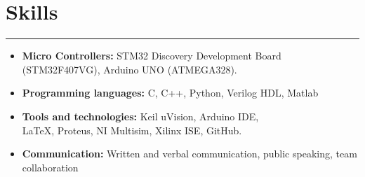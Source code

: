 \documentclass[10pt]{article}
\begin{document}
\section*{Skills}
\hrule
\begin{multicols}{2}
\begin{itemize}[leftmargin=*]
\item \textbf{Micro Controllers:} STM32 Discovery Development Board 
 (STM32F407VG), Arduino UNO (ATMEGA328).
\item \textbf{Programming languages:} C, C++, Python, Verilog HDL, Matlab
\end{itemize}
\columnbreak
\begin{itemize}[leftmargin=*]
\item \textbf{Tools and technologies:} Keil uVision, Arduino IDE, \\LaTeX, Proteus, NI Multisim,  Xilinx ISE, GitHub.
\item \textbf{Communication:} Written and verbal communication, public speaking, team collaboration
\end{itemize}
\end{multicols}

\end{document}

